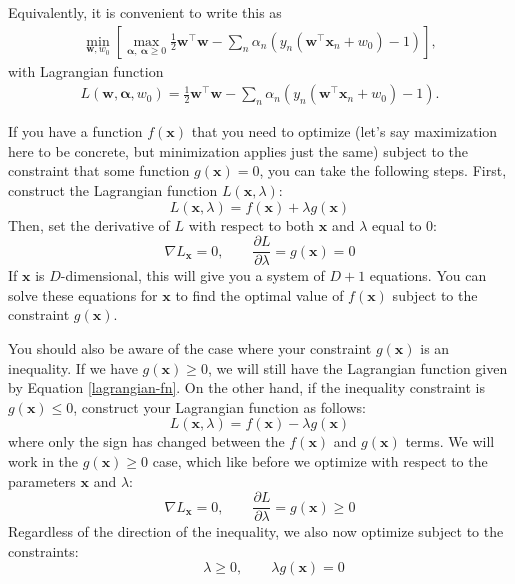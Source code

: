 Equivalently, it is convenient to write this as
\begin{align}
  \min_{\mathbf{w},w_0}\left[\max_{\boldsymbol{\alpha},\ \boldsymbol{\alpha}\geq 0} \frac{1}{2} {\mathbf w}^\top{\mathbf w} -\sum_n \alpha_n(y_{n}(\textbf{w}^\top\textbf{x}_{n} + w_{0}) - 1)\right],
\end{align}
%
with Lagrangian function
%
\begin{align}
  L({\mathbf w},\boldsymbol{\alpha},w_0)=\frac{1}{2} {\mathbf w}^\top{\mathbf w} -\sum_n \alpha_n(y_{n}(\textbf{w}^\top\textbf{x}_{n} + w_{0}) - 1).
  \end{align}



If you have a function $f(\textbf{x})$ that you need to optimize (let's say maximization here to be concrete, but minimization applies just the same) subject to the constraint that some function $g(\textbf{x}) = 0$, you can take the following steps. First, construct the Lagrangian function $L(\textbf{x}, \lambda)$:
\begin{equation} \label{lagrangian-fn}
	L(\textbf{x}, \lambda) = f(\textbf{x}) + \lambda g(\textbf{x})
\end{equation}
Then, set the derivative of $L$ with respect to both $\textbf{x}$ and $\lambda$ equal to 0:
\begin{equation*}
	\nabla L_{\textbf{x}} = 0, \qquad \frac{\partial L}{\partial \lambda} = g(\textbf{x}) = 0
\end{equation*}
If $\textbf{x}$ is $D$-dimensional, this will give you a system of $D+1$ equations. You can solve these equations for $\textbf{x}$ to find the optimal value of $f(\textbf{x})$ subject to the constraint $g(\textbf{x})$.

You should also be aware of the case where your constraint $g(\textbf{x})$ is an inequality. If we have $g(\textbf{x}) \geq 0$, we will still have the Lagrangian function given by Equation \ref{lagrangian-fn}. On the other hand, if the inequality constraint is $g(\textbf{x}) \leq 0$, construct your Lagrangian function as follows:
\begin{equation*}
	L(\textbf{x}, \lambda) = f(\textbf{x}) - \lambda g(\textbf{x})
\end{equation*}
where only the sign has changed between the $f(\textbf{x})$ and $g(\textbf{x})$ terms. We will work in the $g(\textbf{x}) \geq 0$ case, which like before we optimize with respect to the parameters $\textbf{x}$ and $\lambda$:
\begin{equation*}
	\nabla L_{\textbf{x}} = 0, \qquad \frac{\partial L}{\partial \lambda} = g(\textbf{x}) \geq 0
\end{equation*}
Regardless of the direction of the inequality, we also now optimize subject to the constraints:
\begin{equation*}
	\qquad \lambda \geq 0, \qquad \lambda g(\textbf{x}) = 0
\end{equation*}


